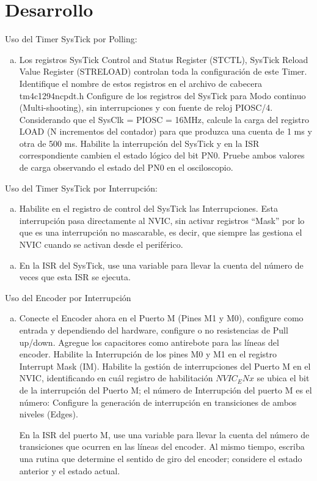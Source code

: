 \documentclass[a4paper,11pt]{article}                 %
\begin{document}
\section{Desarrollo}
Uso del Timer SysTick por Polling:
 
 \begin{enumerate}[a)]
 \item Los registros SysTick Control and Status Register (STCTL), SysTick Reload Value Register (STRELOAD) controlan toda la configuración de este Timer. Identifique el nombre de estos registros en el archivo de cabecera tm4c1294ncpdt.h Configure de los registros del SysTick para Modo continuo (Multi-shooting), sin interrupciones y con fuente de reloj PIOSC/4. Considerando que el SysClk = PIOSC = 16MHz, calcule la carga del registro LOAD (N incrementos del contador) para que produzca una cuenta de 1 ms y otra de 500 ms. Habilite la interrupción del SysTick y en la ISR correspondiente cambien el estado lógico del bit PN0. Pruebe ambos valores de carga observando el estado del PN0 en el osciloscopio. 
 	
 \end{enumerate}
 
Uso del Timer SysTick por Interrupción: 
  \begin{enumerate}[b)]
 	\item Habilite en el registro de control del SysTick las Interrupciones. Esta interrupción pasa directamente al NVIC, sin activar registros “Mask” por lo que es una interrupción no mascarable, es decir, que siempre las gestiona el NVIC cuando se activan desde el periférico. 
  \end{enumerate}
 
   \begin{enumerate}[c)]
 	\item En la ISR del SysTick,  use una variable para llevar la cuenta del número de veces que esta ISR se ejecuta. 
 	
 \end{enumerate}

Uso del Encoder por Interrupción 
    \begin{enumerate}[d)]
 	\item  Conecte el Encoder ahora en el Puerto M (Pines M1 y M0), configure como entrada y dependiendo del hardware, configure o no resistencias de Pull up/down. Agregue los capacitores como antirebote para las líneas del encoder.  Habilite  la Interrupción de los pines M0 y M1 en el registro Interrupt Mask (IM). Habilite la gestión de interrupciones del Puerto M  en el NVIC, identificando en cuál registro de habilitación $NVIC_ENx$ se ubica el bit de la interrupción del Puerto M; el número de Interrupción del puerto M es el número:       Configure la generación de interrupción en transiciones de ambos niveles (Edges). 
 	
 	En la ISR del puerto M, use una variable para llevar la cuenta del número de transiciones que ocurren en las líneas del encoder.  Al mismo tiempo, escriba una 
 	rutina que determine el sentido de giro del encoder; considere el estado anterior y el estado actual. 
 	
 	
 \end{enumerate}
 
\end{document}
